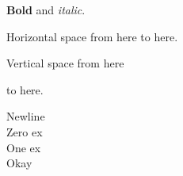 \documentclass{article}
\begin{document}
\textbf{Bold} and \textit{italic}.

Horizontal space from here \hspace{6mm} to here.

Vertical space from here

\vspace{2ex}

to here.

Newline\\
Zero ex\\[0ex]
One ex\\[1ex]
\indent Okay
\end{document}
